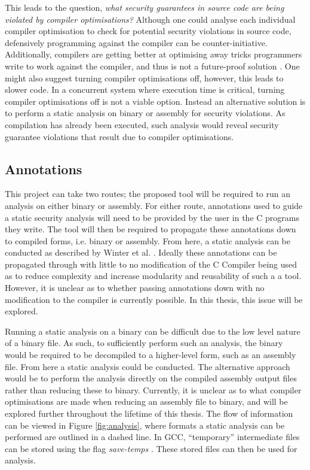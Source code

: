 \documentclass[twocolumn]{article}
\begin{document}
This leads to the question, \textit{what security guarantees in source code are being violated by compiler optimisations?} Although one could analyse each individual compiler optimisation to check for potential security violations in source code, defensively programming against the compiler can be counter-initiative. Additionally, compilers are getting better at optimising away tricks programmers write to work against the compiler, and thus is not a future-proof solution \cite{simon2018you}. One might also suggest turning compiler optimisations off, however, this leads to slower code. In a concurrent system where execution time is critical, turning compiler optimisations off is not a viable option. Instead an alternative solution is to perform a static analysis on binary or assembly for security violations. As compilation has already been executed, such analysis would reveal security guarantee violations that result due to compiler optimisations.

\subsection{Annotations}
This project can take two routes; the proposed tool will be required to run an analysis on either binary or assembly. For either route, annotations used to guide a static security analysis will need to be provided by the user in the C programs they write. The tool will then be required to propagate these annotations down to compiled forms, i.e. binary or assembly. From here, a static analysis can be conducted as described by Winter et al. \cite{winter2020information}. Ideally these annotations can be propagated through with little to no modification of the C Compiler being used as to reduce complexity and increase modularity and reusability of such a a tool. However, it is unclear as to whether passing annotations down with no modification to the compiler is currently possible. In this thesis, this issue will be explored.

Running a static analysis on a binary can be difficult due to the low level nature of a binary file. As such, to sufficiently perform such an analysis, the binary would be required to be decompiled to a higher-level form, such as an assembly file. From here a static analysis could be conducted. The alternative approach would be to perform the analysis directly on the compiled assembly output files rather than reducing these to binary. Currently, it is unclear as to what compiler optimisations are made when reducing an assembly file to binary, and will be explored further throughout the lifetime of this thesis. The flow of information can be viewed in Figure \ref{fig:analysis}, where formats a static analysis can be performed are outlined in a dashed line. In GCC, ``temporary'' intermediate files can be stored using the flag \textit{save-temps} \cite{gccdevoptions}. These stored files can then be used for analysis.
\end{document}
